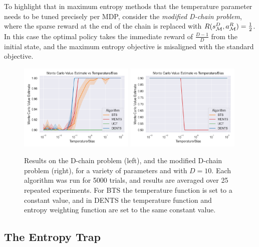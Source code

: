         To highlight that in maximum entropy methods that the temperature parameter needs to be tuned precisely per MDP, consider the \textit{modified D-chain problem}, where the sparse reward at the end of the chain is replaced with $R(s^{D}_{\mathcal{M}},a^R_{\mathcal{M}})=\frac{1}{2}$. In this case the optimal policy takes the immediate reward of $\frac{D-1}{D}$ from the initial state, and the maximum entropy objective is misaligned with the standard objective. 

        \begin{figure}
            \centering
            \includegraphics[width=0.49\textwidth]{figures/ch4/ten_chain.png}
            \includegraphics[width=0.49\textwidth]{figures/ch4/mod_ten_chain.png}
            \caption[Results on the (modified) D-chain problem.]{Results on the D-chain problem (left), and the modified D-chain problem (right), for a variety of parameters and with $D=10$. Each algorithm was run for 5000 trials, and results are averaged over 25 repeated experiments. For BTS the temperature function is set to a constant value, and in DENTS the temperature function and entropy weighting function are set to the same constant value. }
            \label{fig:d_chain_results}
        \end{figure}




    \subsection{The Entropy Trap}

